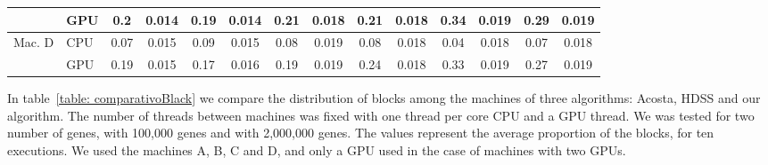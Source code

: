 \documentclass[journal]{IEEEtran}
\begin{document}
\begin{table}[htb]
\begin{scriptsize}
\begin{tabular}{|l|l|l|l|l|l|l|l|l|l|l|l|l|l|}
\cline{2-14}
 & GPU & \multicolumn{1}{c|}{0.2} & \multicolumn{1}{c|}{0.014} & \multicolumn{1}{c|}{0.19} & \multicolumn{1}{c|}{0.014} & \multicolumn{1}{c|}{0.21} & \multicolumn{1}{c|}{0.018} & \multicolumn{1}{c|}{0.21} & \multicolumn{1}{c|}{0.018} & \multicolumn{1}{c|}{0.34} & \multicolumn{1}{c|}{0.019} & \multicolumn{1}{c|}{0.29} & \multicolumn{1}{c|}{0.019} \\ 
\hline
Mac. D & CPU & \multicolumn{1}{c|}{0.07} & \multicolumn{1}{c|}{0.015} & \multicolumn{1}{c|}{0.09} & \multicolumn{1}{c|}{0.015} & \multicolumn{1}{c|}{0.08} & \multicolumn{1}{c|}{0.019} & \multicolumn{1}{c|}{0.08} & \multicolumn{1}{c|}{0.018} & \multicolumn{1}{c|}{0.04} & \multicolumn{1}{c|}{0.018} & \multicolumn{1}{c|}{0.07} & \multicolumn{1}{c|}{0.018} \\ 
\cline{2-14}
 & GPU & \multicolumn{1}{c|}{0.19} & \multicolumn{1}{c|}{0.015} & \multicolumn{1}{c|}{0.17} & \multicolumn{1}{c|}{0.016} & \multicolumn{1}{c|}{0.19} & \multicolumn{1}{c|}{0.019} & \multicolumn{1}{c|}{0.24} & \multicolumn{1}{c|}{0.018} & \multicolumn{1}{c|}{0.33} & \multicolumn{1}{c|}{0.019} & \multicolumn{1}{c|}{0.27} & \multicolumn{1}{c|}{0.019} \\ 
\hline
\end{tabular}
\end{scriptsize}
\label{table: comparativoGene}
\end{table}

In table~\ref{table: comparativoBlack} we compare the distribution of blocks among the machines of three algorithms: Acosta, HDSS and our algorithm. The number of threads between machines was fixed with one thread per core CPU and a GPU thread. We was tested for two number of genes, with 100,000 genes and with 2,000,000 genes. The values ​​represent the average proportion of the blocks, for ten executions. We used the machines A, B, C and D, and only a GPU used in the case of machines with two GPUs.
\end{document}

